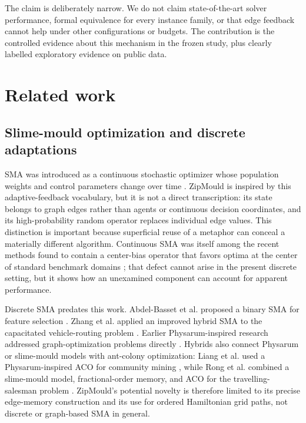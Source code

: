 \documentclass[pdflatex,sn-basic,iicol]{sn-jnl}
\begin{document}
The claim is deliberately narrow. We do not claim state-of-the-art solver performance, formal equivalence for every instance family, or that edge feedback cannot help under other configurations or budgets. The contribution is the controlled evidence about this mechanism in the frozen study, plus clearly labelled exploratory evidence on public data.

\section{Related work}

\subsection{Slime-mould optimization and discrete adaptations}

SMA was introduced as a continuous stochastic optimizer whose population weights and control parameters change over time \citep{li2020sma}. ZipMould is inspired by this adaptive-feedback vocabulary, but it is not a direct transcription: its state belongs to graph edges rather than agents or continuous decision coordinates, and its high-probability random operator replaces individual edge values. This distinction is important because superficial reuse of a metaphor can conceal a materially different algorithm. Continuous SMA was itself among the recent methods found to contain a center-bias operator that favors optima at the center of standard benchmark domains \citep{kudela2022centrebias,kudela2023noone}; that defect cannot arise in the present discrete setting, but it shows how an unexamined component can account for apparent performance.

Discrete SMA predates this work. Abdel-Basset et al. proposed a binary SMA for feature selection \citep{abdelbasset2021binary}. Zhang et al. applied an improved hybrid SMA to the capacitated vehicle-routing problem \citep{zhang2023cvrp}. Earlier Physarum-inspired research addressed graph-optimization problems directly \citep{zhang2016graph}. Hybrids also connect Physarum or slime-mould models with ant-colony optimization: Liang et al. used a Physarum-inspired ACO for community mining \citep{liang2017physarumaco}, while Rong et al. combined a slime-mould model, fractional-order memory, and ACO for the travelling-salesman problem \citep{rong2021smfaco}. ZipMould's potential novelty is therefore limited to its precise edge-memory construction and its use for ordered Hamiltonian grid paths, not discrete or graph-based SMA in general.
\end{document}

